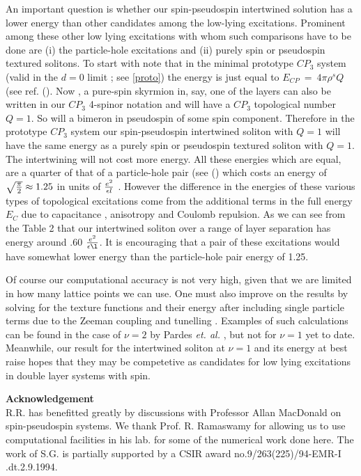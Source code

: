 An important question is whether our spin-pseudospin intertwined  solution
has a lower energy than other candidates among the low-lying
excitations. Prominent among these other low lying excitations
with whom such comparisons have to be done are (i) the 
particle-hole excitations and (ii) purely spin or pseudospin
textured solitons. To start with note that in the  minimal
prototype $CP_{3}$ system (valid in the $d=0$ limit ; see \ref{proto})
the energy is just equal to $ E_{CP} \ = \ 4\pi \rho^{s}Q  \ $ (see ref.
(\cite{Raj}). Now , a pure-spin skyrmion  in, say, one of
the layers can also be written in our $CP_3$ 4-spinor notation and
will  have a $CP_3$ topological number $Q =1$.   So
will a bimeron in pseudospin of some spin component. Therefore in the
prototype $CP_{3}$ system  our spin-pseudospin intertwined soliton with
 $Q=1$ will have the same energy as  a purely spin or pseudospin
textured soliton with $Q=1$. The intertwining will not cost more energy.
   All these energies which are equal,  
   are a quarter of that of a  particle-hole pair
(see (\cite{Arov}) which costs an energy of $\sqrt{{\pi \over
2}} \approx 1.25$ in units of ${e^2 \over \epsilon l}$ .
However the difference in the energies of these various types of
topological excitations come from the additional terms in the
full energy $E_{C}$ due to capacitance ,  anisotropy and Coulomb repulsion.
As we can see from the Table 2 that 
 our intertwined soliton over
a range of layer separation has energy  around .60 $\frac{e^{2}}{\epsilon 
\l}$. 
 It is encouraging 
that  a pair of these excitations would have somewhat lower energy than the
 particle-hole pair energy of 1.25. 

 Of course our computational accuracy is not very high, given that we are 
 limited in how many lattice points we can use. One must  also improve
  on the results by solving for the
  texture functions and their energy after including  
  single particle terms due to the Zeeman coupling
  and tunelling .  Examples of such  calculations can be found
in the case of $\nu =2$ by Pardes {\sl et. al.} \cite{Pard}
, but not for $\nu =1$ yet to date. Meanwhile, our result for
  the intertwined soliton at $\nu = 1$ and its energy
   at best raise hopes that they may be competetive as candidates for low 
   lying excitations in double layer systems with spin.

\vspace{1.0 cm}

{\bf Acknowledgement}\\
R.R. has benefitted greatly by discussions with Professor Allan MacDonald on 
spin-pseudospin systems. We thank Prof. R. Ramaswamy for allowing
us to use computational facilities in his lab. for some of the numerical work 
done here. The work of S.G. is partially supported by a
CSIR award no.9/263(225)/94-EMR-I .dt.2.9.1994.

